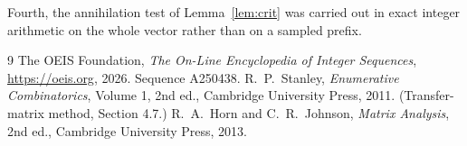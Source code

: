 \documentclass[11pt,a4paper]{article}
\theoremstyle{plain}
\theoremstyle{definition}
\begin{document}
Fourth, the annihilation test of Lemma~\ref{lem:crit} was carried out in exact integer
arithmetic on the whole vector rather than on a sampled prefix.

\begin{thebibliography}{9}
 The OEIS Foundation, \emph{The On-Line Encyclopedia of Integer
Sequences}, \url{https://oeis.org}, 2026. Sequence A250438.
 R.~P.~Stanley, \emph{Enumerative Combinatorics}, Volume 1, 2nd ed.,
Cambridge University Press, 2011. (Transfer-matrix method, Section 4.7.)
 R.~A.~Horn and C.~R.~Johnson, \emph{Matrix Analysis}, 2nd ed., Cambridge
University Press, 2013.
\end{thebibliography}
\end{document}
